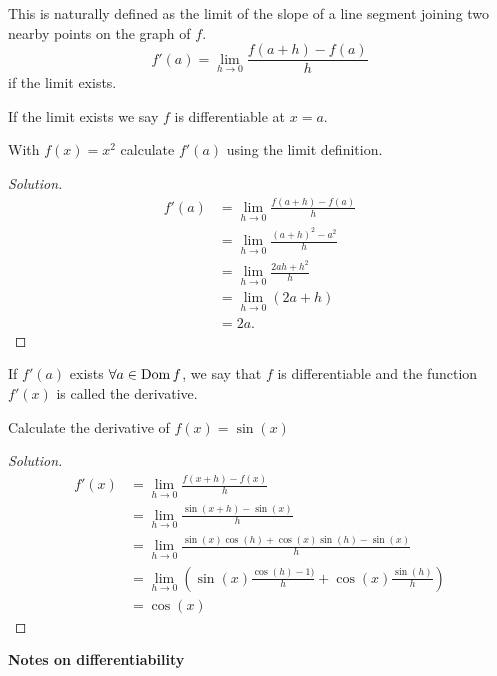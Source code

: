 \documentclass[10pt, a4paper]{article}
\begin{document}
This is naturally defined as the limit of the slope of a line segment joining two nearby points on the graph of $f$.
\[
f'(a) = \lim_{h \rightarrow 0}\frac{f(a + h) - f(a)}{h}
\]
if the limit exists.

If the limit exists we say $f$ is differentiable at $x = a$.

\begin{example}
    With $f(x) = x ^ 2$ calculate $f'(a)$ using the limit definition.
    \begin{proof}[Solution]\renewcommand{\qedsymbol}{}
        \begin{align*}
        f'(a) &= \lim_{h \rightarrow 0}\frac{f(a + h) - f(a)}{h} \\
        &= \lim_{h \rightarrow 0}\frac{(a + h) ^ 2 - a ^ 2}{h} \\
        &= \lim_{h \rightarrow 0}\frac{2ah + h ^ 2}{h} \\
        &= \lim_{h \rightarrow 0}(2a + h) \\
        &= 2a.
        \end{align*}
    \end{proof}
\end{example}
If $f'(a)$ exists $\forall a \in \operatorname{Dom} f$, we say that $f$ is differentiable and the function $f'(x)$ is called the derivative.

\begin{example}
    Calculate the derivative of $f(x) = \sin(x)$
    \begin{proof}[Solution]\renewcommand{\qedsymbol}{}
        \begin{align*}
            f'(x) &= \lim_{h \rightarrow 0}\frac{f(x + h) - f(x)}{h} \\
            &= \lim_{h \rightarrow 0}\frac{\sin(x + h) - \sin(x)}{h} \\
            &= \lim_{h \rightarrow 0}\frac{\sin(x)\cos(h) + \cos(x)\sin(h) - \sin(x)}{h} \\
            &= \lim_{h \rightarrow 0}\left(\sin(x)\frac{\cos(h) - 1)}{h} + \cos(x)\frac{\sin(h)}{h}\right) \\
            &= \cos(x)
        \end{align*}
    \end{proof}
\end{example}

\textbf{Notes on differentiability}
\end{document}
